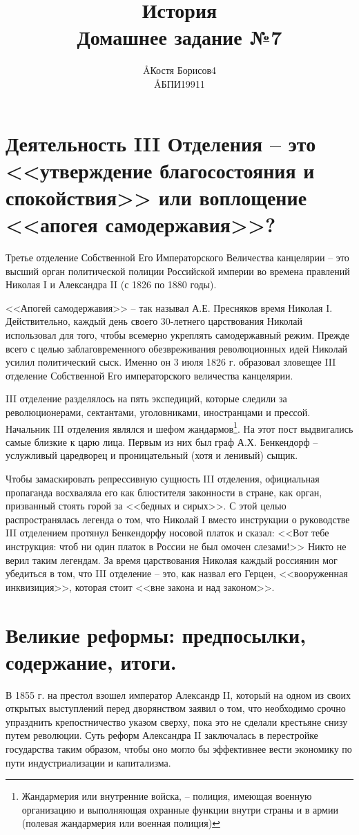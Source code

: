 \documentclass[12pt]{article}
\title{История \\ Домашнее задание №7}
\author{\AA{Костя Борисов}{4} \\ \AA{БПИ199}{11}}
\begin{document}
  \maketitle

  \section{Деятельность III Отделения -- это <<утверждение благосостояния и спокойствия>> или воплощение <<апогея самодержавия>>?}
  Третье отделение Собственной Его Императорского Величества канцелярии -- это высший орган политической полиции Российской империи во времена правлений Николая I и Александра II (с 1826 по 1880 годы).

  <<Апогей самодержавия>> -- так называл А.Е. Пресняков время Николая I.
  Действительно, каждый день своего 30-летнего царствования Николай использовал для того, чтобы всемерно укреплять самодержавный режим.
  Прежде всего с целью заблаговременного обезвреживания революционных идей Николай усилил политический сыск.
  Именно он 3 июля 1826 г. образовал зловещее III отделение Собственной Его императорского величества канцелярии.

  III отделение разделялось на пять экспедиций, которые следили за революционерами, сектантами, уголовниками, иностранцами и прессой.
  Начальник III отделения являлся и шефом жандармов\footnote{Жандармерия или внутренние войска, -- полиция, имеющая военную организацию и выполняющая охранные функции внутри страны и в армии (полевая жандармерия или военная полиция)}.
  На этот пост выдвигались самые близкие к царю лица.
  Первым из них был граф А.Х. Бенкендорф -- услужливый царедворец и проницательный (хотя и ленивый) сыщик.

  Чтобы замаскировать репрессивную сущность III отделения, официальная пропаганда восхваляла его как блюстителя законности в стране,
  как орган, призванный стоять горой за <<бедных и сирых>>.
  С этой целью распространялась легенда о том, что Николай I вместо инструкции о руководстве III отделением протянул Бенкендорфу носовой платок и сказал: <<Вот тебе инструкция: чтоб ни один платок в России не был омочен слезами!>>
  Никто не верил таким легендам.
  За время царствования Николая каждый россиянин мог убедиться в том, что III отделение -- это,
  как назвал его Герцен, <<вооруженная инквизиция>>, которая стоит <<вне закона и над законом>>.

  \setcounter{section}{3}
  \section{Великие реформы: предпосылки, содержание, итоги.}
  В 1855 г. на престол взошел император Александр II, который на одном из своих открытых выступлений перед дворянством заявил о том,
  что необходимо срочно упразднить крепостничество указом сверху, пока это не сделали крестьяне снизу путем революции.
  Суть реформ Александра II заключалась в перестройке государства таким образом,
  чтобы оно могло бы эффективнее вести экономику по пути индустриализации и капитализма.
\end{document}
